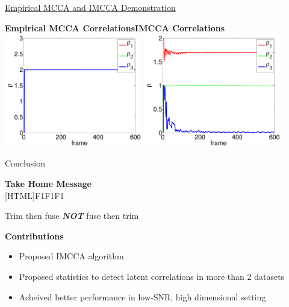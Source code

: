 \documentclass[8pt]{beamer}
\begin{document}
\begin{frame}{\href{run:/home/asendorf/Documents/thesis_videos/mcca_flashing.mp4}{Empirical
      MCCA and
      IMCCA Demonstration}} 

    \begin{center}
      \hspace{-3ex}\textbf{Empirical MCCA Correlations}\hspace{13ex}\textbf{IMCCA Correlations}
        \includegraphics[width=0.45\textwidth]{figures/mcca_cca_corrs.pdf}\hspace{2ex}
        \includegraphics[width=0.45\textwidth]{figures/mcca_icca_corrs.pdf}
    \end{center}

\end{frame}

\begin{frame}{Conclusion}

  \begin{center}
  \textbf{Take Home Message}\\
  [HTML]{F1F1F1}{\parbox{0.5\textwidth}{
      \centering
      Trim then fuse \textbf{\textit{ NOT }} fuse then trim
    }}
  \end{center}

  \vspace{3ex}

  \textbf{Contributions}
  \begin{itemize}
  \item Proposed IMCCA algorithm
  \item Proposed statistics to detect latent correlations in more than 2 datasets
  \item Acheived better performance in low-SNR, high dimensional setting 
  \end{itemize}
\end{frame}
\end{document}
